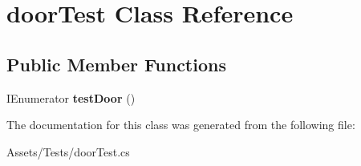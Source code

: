\hypertarget{classdoor_test}{}\section{door\+Test Class Reference}
\label{classdoor_test}
\subsection*{Public Member Functions}
\begin{DoxyCompactItemize}
\item 
\mbox{\label{classdoor_test_a9ebe8d0e1eb9e545ed4f2f13bb4417e5}} 
I\+Enumerator {\bfseries test\+Door} ()
\end{DoxyCompactItemize}


The documentation for this class was generated from the following file\+:\begin{DoxyCompactItemize}
\item 
Assets/\+Tests/door\+Test.\+cs\end{DoxyCompactItemize}
